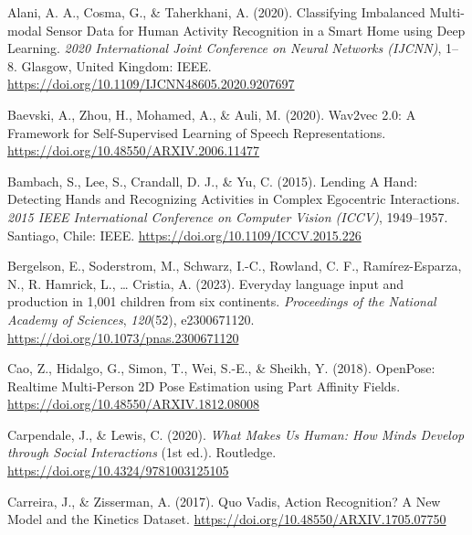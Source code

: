\documentclass[
  man,floatsintext]{apa6}
\newlength{\cslhangindent}
\newenvironment{CSLReferences}[2] %
 {\begin{list}{}{%
  \setlength{\itemindent}{0pt}
  \setlength{\leftmargin}{0pt}
  \setlength{\parsep}{0pt}
  \ifodd #1
   \setlength{\leftmargin}{\cslhangindent}
   \setlength{\itemindent}{-1\cslhangindent}
  \fi
  \setlength{\itemsep}{#2\baselineskip}}}
 {\end{list}}
\begin{document}
\begingroup
\setlength{\parindent}{-0.5in}
\setlength{\leftskip}{0.5in}

\label{refs}
\begin{CSLReferences}{1}{0}
Alani, A. A., Cosma, G., \& Taherkhani, A. (2020). Classifying {Imbalanced Multi-modal Sensor Data} for {Human Activity Recognition} in a {Smart Home} using {Deep Learning}. \emph{2020 {International Joint Conference} on {Neural Networks} ({IJCNN})}, 1--8. Glasgow, United Kingdom: IEEE. \url{https://doi.org/10.1109/IJCNN48605.2020.9207697}

Baevski, A., Zhou, H., Mohamed, A., \& Auli, M. (2020). Wav2vec 2.0: {A Framework} for {Self-Supervised Learning} of {Speech Representations}. \url{https://doi.org/10.48550/ARXIV.2006.11477}

Bambach, S., Lee, S., Crandall, D. J., \& Yu, C. (2015). Lending {A Hand}: {Detecting Hands} and {Recognizing Activities} in {Complex Egocentric Interactions}. \emph{2015 {IEEE International Conference} on {Computer Vision} ({ICCV})}, 1949--1957. Santiago, Chile: IEEE. \url{https://doi.org/10.1109/ICCV.2015.226}

Bergelson, E., Soderstrom, M., Schwarz, I.-C., Rowland, C. F., Ramírez-Esparza, N., R. Hamrick, L., \ldots{} Cristia, A. (2023). Everyday language input and production in 1,001 children from six continents. \emph{Proceedings of the National Academy of Sciences}, \emph{120}(52), e2300671120. \url{https://doi.org/10.1073/pnas.2300671120}

Cao, Z., Hidalgo, G., Simon, T., Wei, S.-E., \& Sheikh, Y. (2018). {OpenPose}: {Realtime Multi-Person 2D Pose Estimation} using {Part Affinity Fields}. \url{https://doi.org/10.48550/ARXIV.1812.08008}

Carpendale, J., \& Lewis, C. (2020). \emph{What {Makes Us Human}: {How Minds Develop} through {Social Interactions}} (1st ed.). Routledge. \url{https://doi.org/10.4324/9781003125105}

Carreira, J., \& Zisserman, A. (2017). Quo {Vadis}, {Action Recognition}? {A New Model} and the {Kinetics Dataset}. \url{https://doi.org/10.48550/ARXIV.1705.07750}


\end{CSLReferences}
\end{document}
